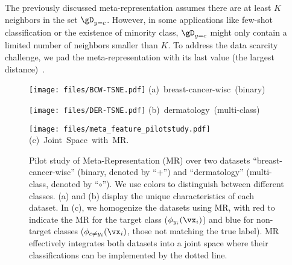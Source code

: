 The previously discussed meta-representation assumes there are at least $K$ neighbors in the set $\gD_{y=c}$. However, in some applications like few-shot classification or the existence of minority class, $\gD_{y=c}$ might only contain a limited number of neighbors smaller than $K$.
To address the data scarcity challenge, we pad the meta-representation with its last value (the largest distance)~\citep{Yang2012Multilabel}. 

\begin{figure}[t] 
    \centering
    \begin{minipage}{0.315\linewidth}
    \texttt{[image: files/BCW-TSNE.pdf]}
    \centering
    {\small \mbox{(a) {breast-cancer-wisc (binary)}}}
    \end{minipage}
    \begin{minipage}{0.315\linewidth}
    \texttt{[image: files/DER-TSNE.pdf]}
    \centering
    {\small \mbox{(b) {dermatology (multi-class)}}}
    \end{minipage}
    \begin{minipage}{0.32\linewidth}
    \texttt{[image: files/meta\_feature\_pilotstudy.pdf]}
    \centering
    {\small \mbox{(c) {Joint Space with MR.}}}
    \end{minipage}
    \vspace{-2mm}
    \caption{Pilot study of Meta-Representation (MR) over two datasets ``breast-cancer-wisc'' (binary, denoted by ``+'') and ``dermatology'' (multi-class, denoted by ``$\circ$''). 
We use colors to distinguish between different classes. (a) and (b) display the unique characteristics of each dataset. In (c), we homogenize the datasets using MR, with red to indicate the MR for the target class ($\phi_{y_i}(\vx_i)$) and blue for non-target classes ($\phi_{c \neq y_i}(\vx_i)$, those not matching the true label). MR effectively integrates both datasets into a joint space where their classifications can be implemented by the dotted line.
    }
    \vspace{-4mm}
    \label{fig:pilot_study}
\end{figure}
